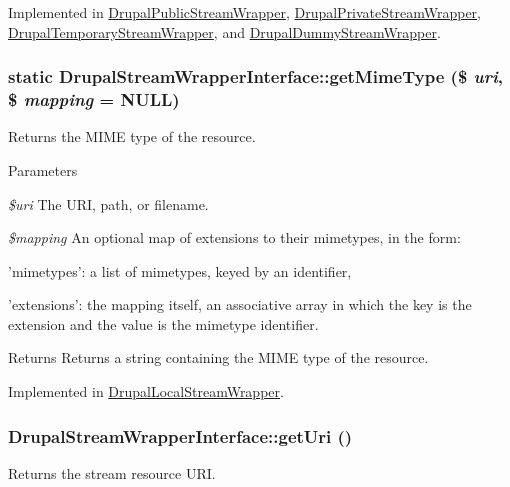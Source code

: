 Implemented in \hyperlink{classDrupalPublicStreamWrapper_a226f45aed9d947aa34aa0b3c7053fdaf}{DrupalPublicStreamWrapper}, \hyperlink{classDrupalPrivateStreamWrapper_a1c1ee83f635dd12b6e806f1d1b1d1de3}{DrupalPrivateStreamWrapper}, \hyperlink{classDrupalTemporaryStreamWrapper_a289ebf62f0ba1a495cb7682812abba05}{DrupalTemporaryStreamWrapper}, and \hyperlink{classDrupalDummyStreamWrapper_a0ab51a9f3ec32db594a32ef4083ae6db}{DrupalDummyStreamWrapper}.\hypertarget{interfaceDrupalStreamWrapperInterface_a7c239b7827b124425e655deb257d34b7}{
\subsubsection[{getMimeType}]{\setlength{\rightskip}{0pt plus 5cm}static DrupalStreamWrapperInterface::getMimeType (\$ {\em uri}, \/  \$ {\em mapping} = {\ttfamily NULL})}}
\label{interfaceDrupalStreamWrapperInterface_a7c239b7827b124425e655deb257d34b7}
Returns the MIME type of the resource.


\begin{DoxyParams}{Parameters}
\item[{\em \$uri}]The URI, path, or filename. \item[{\em \$mapping}]An optional map of extensions to their mimetypes, in the form:
\begin{DoxyItemize}
\item 'mimetypes': a list of mimetypes, keyed by an identifier,
\item 'extensions': the mapping itself, an associative array in which the key is the extension and the value is the mimetype identifier.
\end{DoxyItemize}\end{DoxyParams}
\begin{DoxyReturn}{Returns}
Returns a string containing the MIME type of the resource. 
\end{DoxyReturn}


Implemented in \hyperlink{classDrupalLocalStreamWrapper_ae6baa873a904204192636830d2bacaac}{DrupalLocalStreamWrapper}.\hypertarget{interfaceDrupalStreamWrapperInterface_aeedd16f8876b4b3a0cad73a2759db6ca}{
\subsubsection[{getUri}]{\setlength{\rightskip}{0pt plus 5cm}DrupalStreamWrapperInterface::getUri ()}}
\label{interfaceDrupalStreamWrapperInterface_aeedd16f8876b4b3a0cad73a2759db6ca}
Returns the stream resource URI.

